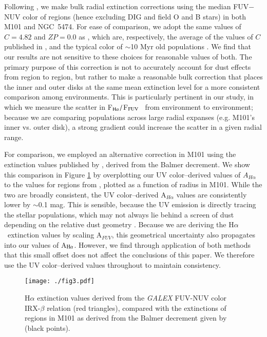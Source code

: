 \documentclass[iop]{emulateapj}
\newcommand{\ha}{H$\alpha$}
\newcommand{\hafuv}{F$_{\rm H\alpha}/$F$_{\rm FUV}$}
\begin{document}
Following \citet{goddard10}, we make bulk radial extinction
corrections using the median FUV$-$NUV color of  regions
(hence excluding DIG and field O and B stars) in both M101 and
NGC~5474.  For ease of comparison, we adopt the same values of
$C=4.82$ and $ZP = 0.0$ as \citet{goddard10}, which are, respectively,
the average of the values of $C$ published in \citet{calzetti01,
  seibert05, cortese06}, and the typical color of $\sim$10 Myr old
populations \citep[Figure 9 in][]{goddard10}.  We find that our
results are not sensitive to these choices for reasonable values of
both.  The primary purpose of this correction is not to accurately
account for dust effects from  region to  region,
but rather to make a reasonable bulk correction that places the inner
and outer disks at the same mean extinction level for a more
consistent comparison among environments.  This is particularly
pertinent in our study, in which we measure the scatter in \hafuv
\ from environment to environment; because we are comparing
populations across large radial expanses (e.g. M101's inner vs. outer
disk), a strong gradient could increase the scatter in a given radial
range.

For comparison, we employed an alternative correction in M101 using
the extinction values published by \citet{scowen92}, derived from the
Balmer decrement.  We show this comparison in Figure \ref{fig:scowen}
by overplotting our UV color--derived values of $A_{H\alpha}$ to the
values for  regions from \citet{scowen92}, plotted as a
function of radius in M101.  While the two are broadly consistent, the
UV color--derived A$_{H\alpha}$ values are consistently lower by
$\sim$0.1 mag.  This is sensible, because the UV emission is directly
tracing the stellar populations, which may not always lie behind a
screen of dust depending on the relative dust geometry \citep[for a
  beautiful demonstration of this, see Figure 1 of][]{whitmore11}.
Because we are deriving the \ha \ extinction values by scaling
  A$_{FUV}$, this geometrical uncertainty also propagates into our
  values of A$_{\rm H\alpha}$.  However, we find through application
of both methods that this small offset does not affect the conclusions
of this paper.  We therefore use the UV color--derived values
throughout to maintain consistency.

\begin{figure}
  \centering
  \texttt{[image: ./fig3.pdf]}
  \caption[Extinction correction comparison]{H$\alpha$ extinction
    values derived from the \emph{GALEX} FUV-NUV color IRX-$\beta$ relation
    (red triangles), compared with the extinctions of 
    regions in M101 as derived from the Balmer decrement given by
    \citet{scowen92} (black points).
    \label{fig:scowen}}
\end{figure}
\end{document}

